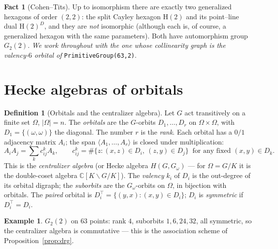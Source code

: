 \documentclass[11pt]{article}
\theoremstyle{definition}
\newtheorem{definition}[theorem]{Definition}
\newtheorem{example}[theorem]{Example}
\newtheorem{fact}[theorem]{Fact}
\newcommand{\C}{\mathbb{C}}
\begin{document}
\begin{fact}[Cohen--Tits]\label{fact:cohentits}
Up to isomorphism there are exactly two generalized hexagons of order
$(2,2)$: the split Cayley hexagon $\mathrm H(2)$ and its point--line dual
$\mathrm H(2)^D$, and they are \emph{not} isomorphic (although each is, of
course, a generalized hexagon with the same parameters). Both have
automorphism group $G_2(2)$. \emph{We work throughout with the one whose
collinearity graph is the valency-$6$ orbital of}
\texttt{PrimitiveGroup(63,2)}.
\end{fact}

\section{Hecke algebras of orbitals}\label{sec:hecke}

\begin{definition}[Orbitals and the centralizer algebra]\label{def:orbital}
Let $G$ act transitively on a finite set $\Omega$, $|\Omega| = n$. The
\emph{orbitals} are the $G$-orbits $D_1,\dots,D_r$ on
$\Omega\times\Omega$, with $D_1 = \{(\omega,\omega)\}$ the diagonal. The
number $r$ is the \emph{rank}. Each orbital has a $0/1$ adjacency matrix
$A_i$; the span $\langle A_1,\dots,A_r\rangle$ is closed under
multiplication:
\[
A_i A_j = \sum_k c_{ij}^k A_k, \qquad
c_{ij}^k = \#\{z : (x,z)\in D_i,\ (z,y)\in D_j\}
\ \text{ for any fixed } (x,y)\in D_k .
\]
This is the \emph{centralizer algebra} (or Hecke algebra
$H(G, G_\omega)$ --- for $\Omega = G/K$ it is the double-coset algebra
$\C[K\backslash G/K]$). The \emph{valency} $k_i$ of $D_i$ is the out-degree
of its orbital digraph; the \emph{suborbits} are the $G_\omega$-orbits on
$\Omega$, in bijection with orbitals. The \emph{paired} orbital is
$D_i^\top = \{(y,x) : (x,y)\in D_i\}$; $D_i$ is \emph{symmetric} if
$D_i^\top = D_i$.
\end{definition}

\begin{example}
$G_2(2)$ on $63$ points: rank $4$, suborbits $1,6,24,32$, all symmetric, so
the centralizer algebra is commutative --- this is the association scheme of
Proposition~\ref{prop:drg}.
\end{example}
\end{document}
